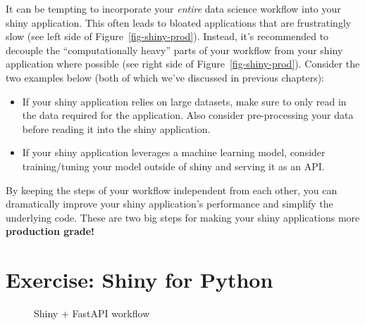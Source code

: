 \documentclass[
  letterpaper,
  DIV=11,
  numbers=noendperiod]{scrreprt}
\begin{document}
It can be tempting to incorporate your \emph{entire} data science
workflow into your shiny application. This often leads to bloated
applications that are frustratingly slow (see left side of
Figure~\ref{fig-shiny-prod}). Instead, it's recommended to decouple the
``computationally heavy'' parts of your workflow from your shiny
application where possible (see right side of
Figure~\ref{fig-shiny-prod}). Consider the two examples below (both of
which we've discussed in previous chapters):

\begin{itemize}
\item
  If your shiny application relies on large datasets, make sure to only
  read in the data required for the application. Also consider
  pre-processing your data before reading it into the shiny application.
\item
  If your shiny application leverages a machine learning model, consider
  training/tuning your model outside of shiny and serving it as an API.
\end{itemize}

By keeping the steps of your workflow independent from each other, you
can dramatically improve your shiny application's performance and
simplify the underlying code. These are two big steps for making your
shiny applications more \textbf{production grade!}

\chapter{Exercise: Shiny for Python}\label{sec-exercise-shiny-py}

\begin{figure}


\caption{\label{fig-shiny-fastapi}Shiny + FastAPI workflow}

\end{figure}%
\end{document}
